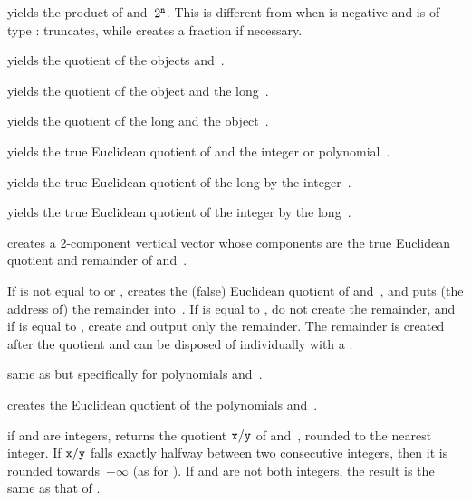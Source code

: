  yields the product of 
and~$2^{{\tt n}}$. This is different from  when  is negative
and  is of type :  truncates, while 
creates a fraction if necessary.

 yields the quotient of the objects
 and~.

 yields the quotient of the object
 and the long~.

 yields the quotient of the long
 and the object~.

 yields the true Euclidean
quotient of  and the integer or polynomial~.

 yields the true Euclidean
quotient of the long  by the integer~.

 yields the true Euclidean
quotient of the integer  by the long~.

 creates a 2-component vertical
vector whose components are the true Euclidean quotient and remainder
of  and~.

 If  is not equal to
 or , creates the (false) Euclidean quotient of
 and~, and puts (the address of) the remainder into~.
If  is equal to , do not create the remainder, and if
 is equal to , create and output only the remainder.
The remainder is created after the quotient and can be disposed of
individually with a .

 same as  but
specifically for polynomials  and~.

 creates the Euclidean quotient of the
polynomials  and~.

 if  and  are integers,
returns the quotient ${\tt x}/{\tt y}$ of  and~, rounded to
the nearest integer. If ${\tt x}/{\tt y}$ falls exactly halfway between
two consecutive integers, then it is rounded towards~$+\infty$ (as for
). If  and  are not both integers, the result
is the same as that of .

